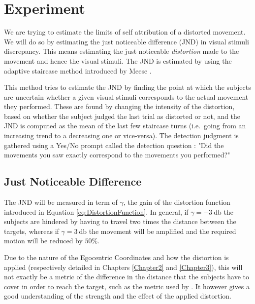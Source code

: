 
\chapter{Experiment} %

\label{Chapter4} %

We are trying to estimate the limits of self attribution of a distorted movement. We will do so by estimating the just noticeable difference (JND) in visual stimuli discrepancy. This means estimating the just noticeable \textit{distortion} made to the movement and hence the visual stimuli. The JND is estimated by using the adaptive staircase method introduced by Meese \cite{meese1995using}.

This method tries to estimate the JND by finding the point at which the subjects are uncertain whether a given visual stimuli corresponds to the actual movement they performed. These are found by changing the intensity of the distortion, based on whether the subject judged the last trial as distorted or not, and the JND is computed as the mean of the last few staircase turns (i.e.\ going from an increasing trend to a decreasing one or vice-versa). The detection judgment is gathered using a Yes/No prompt called the detection question : "Did the movements you saw exactly correspond to the movements you performed?"

\section{Just Noticeable Difference}

The JND will be measured in term of $\gamma$, the gain of the distortion function introduced in Equation \ref{eq:DistortionFunction}. In general, if $\gamma = \SI{-3}{\decibel}$ the subjects are hindered by having to travel two times the distance between the targets, whereas if $\gamma = \SI{3}{\decibel}$ the movement will be amplified and the required motion will be reduced by $50\%$.

Due to the nature of the Egocentric Coordinates and how the distortion is applied (respectively detailed in Chapters \ref{Chapter2} and \ref{Chapter3}), this will not exactly be a metric of the difference in the distance that the subjects have to cover in order to reach the target, such as the metric used by \cite{debarba2017embodiment}. It however gives a good understanding of the strength and the effect of the applied distortion.

